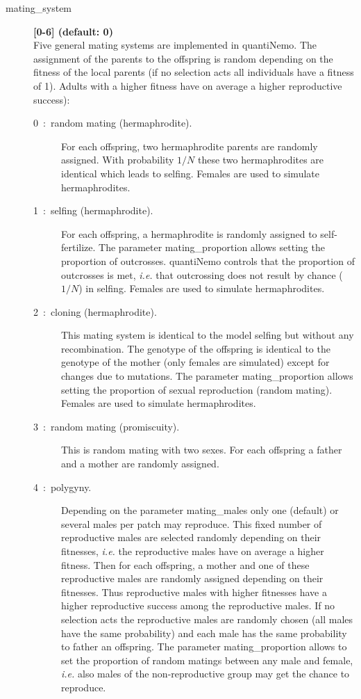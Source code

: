 \documentclass[letterpaper,12pt,oneside]{book}
\begin{document}
\begin{description}

\item[mating\_system]\textbf{[0-6] (default: 0)}\\
Five general mating systems are implemented in quantiNemo. The assignment of the parents to the offspring is random depending on the fitness of the local parents (if no selection acts all individuals have a fitness of 1). Adults with a higher fitness have on average a higher reproductive success):

\begin{description}
\item [0~:~random mating (hermaphrodite).] For each offspring, two hermaphrodite parents are randomly assigned. With probability $1/N$ these two hermaphrodites are identical which leads to selfing. Females are used to simulate hermaphrodites. 

\item [1~:~selfing (hermaphrodite).] For each offspring, a hermaphrodite is randomly assigned to self-fertilize. The parameter \textsf{mating\_proportion} allows setting the proportion of outcrosses. quantiNemo controls that the proportion of outcrosses is met, \textit{i.e.} that outcrossing does not result by chance ($1/N$) in selfing. Females are used to simulate hermaphrodites.

\item [2~:~cloning (hermaphrodite).] This mating system is identical to the model selfing but without any recombination. The genotype of the offspring is identical to the genotype of the mother (only females are simulated) except for changes due to mutations. The parameter \textsf{mating\_proportion} allows setting the proportion of sexual reproduction (random mating). Females are used to simulate hermaphrodites.

\item [3~:~random mating (promiscuity).] This is random mating with two sexes. For each offspring a father and a mother are randomly assigned.

\item [4~:~polygyny.] Depending on the parameter \textsf{mating\_males} only one (default) or several males per patch may reproduce. This fixed number of reproductive males are selected randomly depending on their fitnesses, \textit{i.e.} the reproductive males have on average a higher fitness. Then for each offspring, a mother and one of these reproductive males are randomly assigned depending on their fitnesses. Thus reproductive males with higher fitnesses have a higher reproductive success among the reproductive males. If no selection acts the reproductive males are randomly chosen (all males have the same probability) and each male has the same probability to father an offspring. The parameter \textsf{mating\_proportion} allows to set the proportion of random matings between any male and female, \textit{i.e.} also males of the non-reproductive group may get the chance to reproduce.


\end{description}
\end{description}
\end{document}
